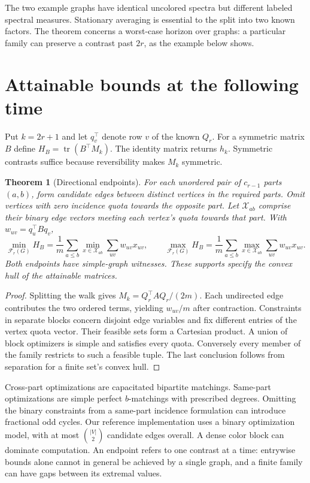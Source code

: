 \documentclass[11pt]{article}
\newtheorem{theorem}{Theorem}
\newcommand{\tr}{\operatorname{tr}}
\newcommand{\F}{\mathcal F}
\begin{document}
The two example graphs have identical uncolored spectra but different labeled spectral measures. Stationary averaging is essential to the split into two known factors. The theorem concerns a worst-case horizon over graphs: a particular family can preserve a contrast past $2r$, as the example below shows.

\section{Attainable bounds at the following time}
Put $k=2r+1$ and let $q_v^\top$ denote row $v$ of the known $Q_r$. For a symmetric matrix $B$ define $H_B=\tr(B^\top M_k)$. The identity matrix returns $h_k$. Symmetric contrasts suffice because reversibility makes $M_k$ symmetric.

\begin{theorem}[Directional endpoints]\label{thm:ext}
For each unordered pair of $c_{r-1}$ parts $(a,b)$, form candidate edges between distinct vertices in the required parts. Omit vertices with zero incidence quota towards the opposite part. Let $\mathcal X_{ab}$ comprise their binary edge vectors meeting each vertex's quota towards that part. With $w_{uv}=q_u^\top Bq_v$,
\[
\min_{\F_r(G)} H_B=\frac{1}{m}\sum_{a\le b}
   \min_{x\in\mathcal X_{ab}}\sum_{uv} w_{uv}x_{uv},\qquad
\max_{\F_r(G)} H_B=\frac{1}{m}\sum_{a\le b}
   \max_{x\in\mathcal X_{ab}}\sum_{uv} w_{uv}x_{uv}.
\]
Both endpoints have simple-graph witnesses. These supports specify the convex hull of the attainable matrices.
\end{theorem}
\begin{proof}
Splitting the walk gives $M_k=Q_r^\top A Q_r/(2m)$. Each undirected edge contributes the two ordered terms, yielding $w_{uv}/m$ after contraction. Constraints in separate blocks concern disjoint edge variables and fix different entries of the vertex quota vector. Their feasible sets form a Cartesian product. A union of block optimizers is simple and satisfies every quota. Conversely every member of the family restricts to such a feasible tuple. The last conclusion follows from separation for a finite set's convex hull.
\end{proof}

Cross-part optimizations are capacitated bipartite matchings. Same-part optimizations are simple perfect $b$-matchings with prescribed degrees. Omitting the binary constraints from a same-part incidence formulation can introduce fractional odd cycles. Our reference implementation uses a binary optimization model, with at most $\binom{|V|}{2}$ candidate edges overall. A dense color block can dominate computation. An endpoint refers to one contrast at a time: entrywise bounds alone cannot in general be achieved by a single graph, and a finite family can have gaps between its extremal values.
\end{document}
